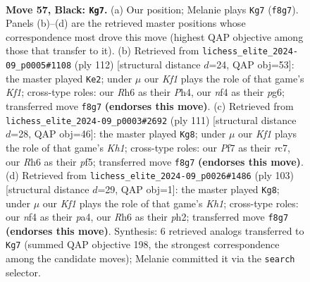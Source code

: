 \documentclass[11pt]{article}
\begin{document}
\clearpage

\begin{figure}[p]\centering
\begin{subfigure}{0.46\textwidth}\centering
\resizebox{\linewidth}{!}{%
\newchessgame
\chessboard[
  setfen={2R2k2/3r1p2/7r/p7/4KN2/1P6/R2p3P/8 b - - 1 57},
  showmover=false,
  pgfstyle=straightmove, color=movearrow, markmove={f8-g7}
]}
\caption{}
\end{subfigure}\hfill
\begin{subfigure}{0.46\textwidth}\centering
\resizebox{\linewidth}{!}{%
\newchessgame
\chessboard[
  setfen={3k4/3P4/5pp1/8/1p5P/1P1R4/5P2/1r3K2 w - - 11 57},
  showmover=false,
  pgfstyle=straightmove, color=movearrow, markmove={f1-e2}
]}
\caption{}
\end{subfigure}
\\[4pt]
\begin{subfigure}{0.46\textwidth}\centering
\resizebox{\linewidth}{!}{%
\newchessgame
\chessboard[
  setfen={3r3k/2R5/1p5R/p4Pp1/3P4/4P3/rp6/6K1 b - - 1 56},
  showmover=false,
  pgfstyle=straightmove, color=movearrow, markmove={h8-g8}
]}
\caption{}
\end{subfigure}\hfill
\begin{subfigure}{0.46\textwidth}\centering
\resizebox{\linewidth}{!}{%
\newchessgame
\chessboard[
  setfen={7k/pp3R1p/8/8/P7/8/1r1p3P/3K4 b - - 2 52},
  showmover=false,
  pgfstyle=straightmove, color=movearrow, markmove={h8-g8}
]}
\caption{}
\end{subfigure}
\caption{\textbf{Move 57, Black: \texttt{Kg7}.} (a) Our position; Melanie plays \texttt{Kg7} (\texttt{f8g7}). Panels (b)--(d) are the retrieved master positions whose correspondence most drove this move (highest QAP objective among those that transfer to it). (b) Retrieved from \texttt{lichess\_elite\_2024-09\_p0005\#1108} (ply 112) [structural distance $d$=24, QAP obj=53]: the master played \texttt{Ke2}; under $\mu$ our \emph{Kf1} plays the role of that game's \emph{Kf1}; cross-type roles: our \emph{R}h6 as their \emph{P}h4, our \emph{n}f4 as their \emph{p}g6; transferred move \texttt{f8g7} \textbf{(endorses this move)}. (c) Retrieved from \texttt{lichess\_elite\_2024-09\_p0003\#2692} (ply 111) [structural distance $d$=28, QAP obj=46]: the master played \texttt{Kg8}; under $\mu$ our \emph{Kf1} plays the role of that game's \emph{Kh1}; cross-type roles: our \emph{P}f7 as their \emph{r}c7, our \emph{R}h6 as their \emph{p}f5; transferred move \texttt{f8g7} \textbf{(endorses this move)}. (d) Retrieved from \texttt{lichess\_elite\_2024-09\_p0026\#1486} (ply 103) [structural distance $d$=29, QAP obj=1]: the master played \texttt{Kg8}; under $\mu$ our \emph{Kf1} plays the role of that game's \emph{Kh1}; cross-type roles: our \emph{n}f4 as their \emph{p}a4, our \emph{R}h6 as their \emph{p}h2; transferred move \texttt{f8g7} \textbf{(endorses this move)}. Synthesis: 6 retrieved analogs transferred to \texttt{Kg7} (summed QAP objective 198, the strongest correspondence among the candidate moves); Melanie committed it via the \texttt{search} selector.}
\label{fig:thought-m113}
\end{figure}
\end{document}
